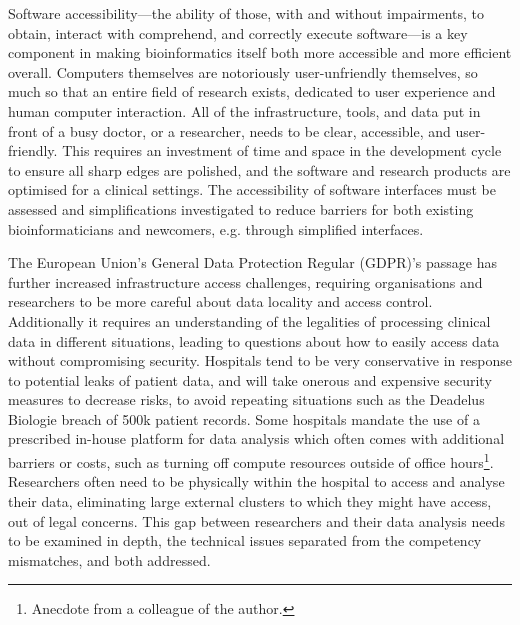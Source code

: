 Software accessibility---the ability of those, with and without impairments, to obtain, interact with comprehend, and correctly execute software---is a key component in making bioinformatics itself both more accessible and more efficient overall\cite{Krampis_2022}.
Computers themselves are notoriously user-unfriendly themselves, so much so that an entire field of research exists, dedicated to user experience and human computer interaction\cite{lazar2017research}.
All of the infrastructure, tools, and data put in front of a busy doctor, or a researcher, needs to be clear, accessible, and user-friendly\cite{Crisan_2018,Tornheim_2019,Valenstein_2008,Hettinger_2017}.
This requires an investment of time and space in the development cycle to ensure all sharp edges are polished, and the software and research products are optimised for a clinical settings.
The accessibility of software interfaces must be assessed and simplifications investigated to reduce barriers for both existing bioinformaticians and newcomers, e.g. through simplified interfaces\cite{Wratten_2021}.

The European Union's General Data Protection Regular (GDPR)'s passage has further increased infrastructure access challenges, requiring organisations and researchers to be more careful about data locality and access control. Additionally it requires an understanding of the legalities of processing clinical data in different situations, leading to questions about how to easily access data without compromising security\cite{van_Kessel_2023}.
Hospitals tend to be very conservative in response to potential leaks of patient data, and will take onerous and expensive security measures to decrease risks, to avoid repeating situations such as the Deadelus Biologie breach of 500k patient records\cite{enisa-threat-landscape,Yuan_2019,health-data-breach}.
Some hospitals mandate the use of a prescribed in-house platform for data analysis which often comes with additional barriers or costs, such as turning off compute resources outside of office hours\footnote{Anecdote from a colleague of the author.}.
Researchers often need to be physically within the hospital to access and analyse their data, eliminating large external clusters to which they might have access, out of legal concerns.
This gap between researchers and their data analysis needs to be examined in depth, the technical issues separated from the competency mismatches, and both addressed.

